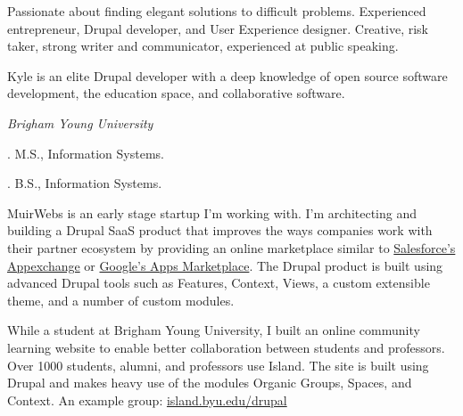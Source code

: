 \documentclass[11pt]{article}
\begin{document}
\medskip

\reversemarginpar

\medskip       

\medskip
{}

\noindent Passionate about finding elegant solutions to difficult problems. Experienced entrepreneur, Drupal developer, and User Experience designer. Creative, risk taker, strong writer and communicator, experienced at public speaking.

\medskip

\noindent Kyle is an elite Drupal developer with a deep knowledge of open source software development, the education space, and collaborative software.

\bigskip



\noindent\emph{Brigham Young University \vspace{0.15in}}

. M.S., Information Systems.

. B.S., Information Systems.

\bigskip
 
\medskip


\noindent MuirWebs is an early stage startup I'm working with. I'm architecting and building a Drupal SaaS product that improves the ways companies work with their partner ecosystem by providing an online marketplace similar to \href{http://appexchange.salesforce.com/}{Salesforce's Appexchange} or \href{https://www.google.com/enterprise/marketplace/}{Google's Apps Marketplace}. The Drupal product is built using advanced Drupal tools such as Features, Context, Views, a custom extensible theme, and a number of custom modules.

\bigskip


\noindent While a student at Brigham Young University, I built an online community learning website to enable better collaboration between students and professors. Over 1000 students, alumni, and professors use Island. The site is built using Drupal and makes heavy use of the modules Organic Groups, Spaces, and Context. An example group: \href{https://island.byu.edu/drupal}{island.byu.edu/drupal}
\end{document}
